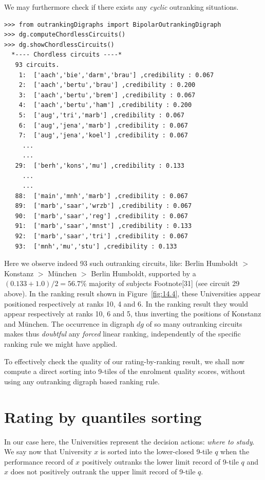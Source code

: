 We may furthermore check if there exists any \emph{cyclic} outranking situations.
\begin{lstlisting}[caption={Enumerating chordless outranking circuits},label=list:14.5]
>>> from outrankingDigraphs import BipolarOutrankingDigraph
>>> dg.computeChordlessCircuits()
>>> dg.showChordlessCircuits()
  *---- Chordless circuits ----*
   93 circuits.
    1:  ['aach','bie','darm','brau'] ,credibility : 0.067
    2:  ['aach','bertu','brau'] ,credibility : 0.200
    3:  ['aach','bertu','brem'] ,credibility : 0.067
    4:  ['aach','bertu','ham'] ,credibility : 0.200
    5:  ['aug','tri','marb'] ,credibility : 0.067
    6:  ['aug','jena','marb'] ,credibility : 0.067
    7:  ['aug','jena','koel'] ,credibility : 0.067
     ...
     ...
   29:  ['berh','kons','mu'] ,credibility : 0.133
     ...
     ...
   88:  ['main','mnh','marb'] ,credibility : 0.067
   89:  ['marb','saar','wrzb'] ,credibility : 0.067
   90:  ['marb','saar','reg'] ,credibility : 0.067
   91:  ['marb','saar','mnst'] ,credibility : 0.133
   92:  ['marb','saar','tri'] ,credibility : 0.067
   93:  ['mnh','mu','stu'] ,credibility : 0.133
 \end{lstlisting}
Here we observe indeed 93 such outranking circuits, like: Berlin Humboldt $>$ Konstanz $>$ München $>$ Berlin Humboldt, supported by a $(0.133 + 1.0)/2 = 56.7\%$ majority of subjects Footnote[31] (see circuit 29 above). In the \Copeland ranking result shown in Figure~\vref{fig:14.4}, these Universities appear positioned respectively at ranks 10, 4 and 6. In the \NetFlows ranking result they would appear respectively at ranks 10, 6 and 5, thus inverting the positions of Konstanz and München. The occurrence in digraph $dg$ of so many outranking circuits makes thus \emph{doubtful} any \emph{forced} linear ranking, independently of the specific ranking rule we might have applied.

To effectively check the quality of our \Copeland rating-by-ranking result, we shall now compute a direct sorting into 9-tiles of the enrolment quality scores, without using any outranking digraph based ranking rule.

\section{Rating by quantiles sorting}
\label{sec:14.3}

In our case here, the Universities represent the decision actions: \emph{where to study}. We say now that University $x$ is sorted into the lower-closed 9-tile $q$ when the performance record of $x$ positively outranks the lower limit record of 9-tile $q$ and $x$ does not positively outrank the upper limit record of 9-tile $q$. 

